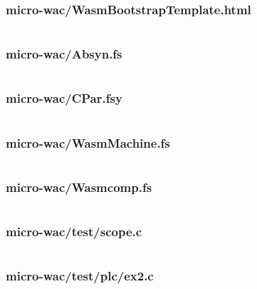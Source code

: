 \documentclass[a4paper]{article}
\begin{document}
\newpage
\subsubsection{micro-wac/WasmBootstrapTemplate.html}
\label{sec:appendix:code:bootstrap-template}
\inputminted[breaklines,tabsize=2,linenos]{html}{../micro-wac/WasmBootstrapTemplate.html}

\newpage
\subsubsection{micro-wac/Absyn.fs}
\label{sec:appendix:code:Absyn.fs}
\inputminted[breaklines,tabsize=2,linenos]{fsharp}{../micro-wac/Absyn.fs}

\newpage
\subsubsection{micro-wac/CPar.fsy}
\label{sec:appendix:code:CPar.fsy}
\inputminted[breaklines,tabsize=2,linenos]{fsharp}{../micro-wac/CPar.fsy}

\newpage
\subsubsection{micro-wac/WasmMachine.fs}
\label{sec:appendix:code:WasmMachine.fs}
\inputminted[breaklines,tabsize=2,linenos]{fsharp}{../micro-wac/WasmMachine.fs}

\newpage
\subsubsection{micro-wac/Wasmcomp.fs}
\label{sec:appendix:code:Wasmcomp.fs}
\inputminted[breaklines,tabsize=2,linenos]{fsharp}{../micro-wac/Wasmcomp.fs}

\newpage
\subsubsection{micro-wac/test/scope.c}
\label{sec:appendix:code:test-scope.c}
\inputminted[breaklines,tabsize=2,linenos]{c}{../micro-wac/test/scope.c}

\newpage
\subsubsection{micro-wac/test/plc/ex2.c}
\label{sec:appendix:code:plc-ex2.c}
\inputminted[breaklines,tabsize=2,linenos]{c}{../micro-wac/test/plc/ex2.c}
\end{document}
